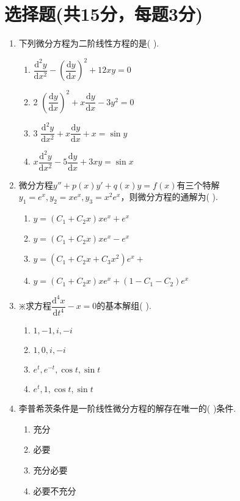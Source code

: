 \documentclass{ctexart}
\begin{document}
	\section{选择题(共15分，每题3分)}
	\begin{enumerate}
		\item 下列微分方程为二阶线性方程的是( ).
			\begin{enumerate}
				\item $\dfrac{\mathrm{d}^2 y}{\mathrm{d}x^2}-(\dfrac{\mathrm{d}y}{\mathrm{d}x})^2+12xy=0$
				\item 2 $(\dfrac{\mathrm{d}y}{\mathrm{d}x})^2+x\dfrac{\mathrm{d}y}{\mathrm{d}x}-3y^2=0$
				\item 3 $\dfrac{\mathrm{d}^2 y}{\mathrm{d}x^2}+x\dfrac{\mathrm{d}y}{\mathrm{d}x}+x=\sin y$
				\item $x\dfrac{\mathrm{d}^2y}{\mathrm{d}x^2}-5\dfrac{\mathrm{d}y}{\mathrm{d}x}+3xy=\sin x$
			\end{enumerate}
		
		\item 微分方程$y''+p(x)y'+q(x)y=f(x)$有三个特解$y_1=e^x, y_2=xe^x, y_3=x^2e^x$，则微分方程的通解为( ).
			\begin{enumerate}
				\item $y=(C_1+C_2x)xe^x+e^x$
				\item $y=(C_1+C_2x)xe^x-e^x$
				\item $y=(C_1+C_2x+C_3x^2)e^x+$
				\item $y=(C_1+C_2x)xe^x+(1-C_1-C_2)e^x$
			\end{enumerate}
		
		\item $\divideontimes$求方程$\dfrac{\mathrm{d}^4 x}{\mathrm{d}t^4}-x=0$的基本解组( ).
			\begin{enumerate}
				\item $1,-1,i,-i$
				\item $1,0,i,-i$
				\item $e^t,e^{-t},\cos t,\sin t$
				\item $e^t,1,\cos t,\sin t$
			\end{enumerate}
		
		\item 李普希茨条件是一阶线性微分方程的解存在唯一的( )条件.
			\begin{enumerate}
				\item 充分
				\item 必要
				\item 充分必要
				\item 必要不充分
			\end{enumerate}
		

\end{enumerate}
\end{document}
